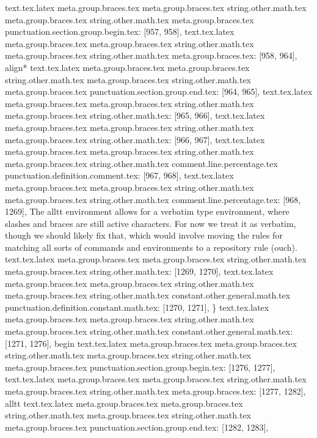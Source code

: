{{{{{{{{{{{{{{{{{{{{{{{{{{{{{{{{text.tex.latex meta.group.braces.tex meta.group.braces.tex string.other.math.tex meta.group.braces.tex string.other.math.tex meta.group.braces.tex punctuation.section.group.begin.tex: [957, 958], {{}
text.tex.latex meta.group.braces.tex meta.group.braces.tex string.other.math.tex meta.group.braces.tex string.other.math.tex meta.group.braces.tex: [958, 964], {align*}
text.tex.latex meta.group.braces.tex meta.group.braces.tex string.other.math.tex meta.group.braces.tex string.other.math.tex meta.group.braces.tex punctuation.section.group.end.tex: [964, 965], {}}
text.tex.latex meta.group.braces.tex meta.group.braces.tex string.other.math.tex meta.group.braces.tex string.other.math.tex: [965, 966], {
}
text.tex.latex meta.group.braces.tex meta.group.braces.tex string.other.math.tex meta.group.braces.tex string.other.math.tex: [966, 967], {
}
text.tex.latex meta.group.braces.tex meta.group.braces.tex string.other.math.tex meta.group.braces.tex string.other.math.tex comment.line.percentage.tex punctuation.definition.comment.tex: [967, 968], {%
text.tex.latex meta.group.braces.tex meta.group.braces.tex string.other.math.tex meta.group.braces.tex string.other.math.tex comment.line.percentage.tex: [968, 1269], { The alltt environment allows for a verbatim type environment, where slashes and braces are still active characters. For now we treat it as verbatim, though we should likely fix that, which would involve moving the rules for matching all sorts of commands and environments to a repository rule (ouch).}
text.tex.latex meta.group.braces.tex meta.group.braces.tex string.other.math.tex meta.group.braces.tex string.other.math.tex: [1269, 1270], {
}
text.tex.latex meta.group.braces.tex meta.group.braces.tex string.other.math.tex meta.group.braces.tex string.other.math.tex constant.other.general.math.tex punctuation.definition.constant.math.tex: [1270, 1271], {\}
text.tex.latex meta.group.braces.tex meta.group.braces.tex string.other.math.tex meta.group.braces.tex string.other.math.tex constant.other.general.math.tex: [1271, 1276], {begin}
text.tex.latex meta.group.braces.tex meta.group.braces.tex string.other.math.tex meta.group.braces.tex string.other.math.tex meta.group.braces.tex punctuation.section.group.begin.tex: [1276, 1277], {{}
text.tex.latex meta.group.braces.tex meta.group.braces.tex string.other.math.tex meta.group.braces.tex string.other.math.tex meta.group.braces.tex: [1277, 1282], {alltt}
text.tex.latex meta.group.braces.tex meta.group.braces.tex string.other.math.tex meta.group.braces.tex string.other.math.tex meta.group.braces.tex punctuation.section.group.end.tex: [1282, 1283], {}}
}}}}}}}}}}}}}}}}}}}}}}}}}}}}}}}}}}
